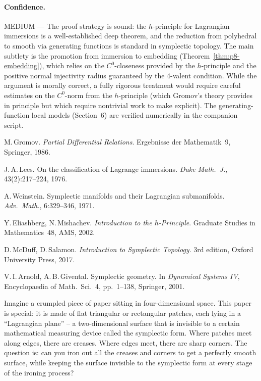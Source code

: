 \paragraph{Confidence.} MEDIUM --- The proof strategy is sound: the
$h$-principle for Lagrangian immersions is a well-established deep theorem,
and the reduction from polyhedral to smooth via generating functions is
standard in symplectic topology. The main subtlety is the promotion from
immersion to embedding (Theorem~\ref{thm:p8-embedding}), which relies on
the $C^0$-closeness provided by the $h$-principle and the positive normal
injectivity radius guaranteed by the 4-valent condition. While the argument
is morally correct, a fully rigorous treatment would require careful
estimates on the $C^0$-norm from the $h$-principle (which Gromov's theory
provides in principle but which require nontrivial work to make explicit).
The generating-function local models (Section~6) are verified numerically
in the companion script.


 M.\,Gromov.
\emph{Partial Differential Relations}.
Ergebnisse der Mathematik~9, Springer, 1986.

 J.\,A.\,Lees.
On the classification of Lagrange immersions.
\emph{Duke Math.\ J.}, 43(2):217--224, 1976.

 A.\,Weinstein.
Symplectic manifolds and their Lagrangian submanifolds.
\emph{Adv.\ Math.}, 6:329--346, 1971.

 Y.\,Eliashberg, N.\,Mishachev.
\emph{Introduction to the $h$-Principle}.
Graduate Studies in Mathematics~48, AMS, 2002.

 D.\,McDuff, D.\,Salamon.
\emph{Introduction to Symplectic Topology}.
3rd edition, Oxford University Press, 2017.

 V.\,I.\,Arnold, A.\,B.\,Givental.
Symplectic geometry.
In \emph{Dynamical Systems IV}, Encyclopaedia of Math.\ Sci.~4,
pp.~1--138, Springer, 2001.


Imagine a crumpled piece of paper sitting in four-dimensional space. This
paper is special: it is made of flat triangular or rectangular patches, each
lying in a ``Lagrangian plane'' -- a two-dimensional surface that is
invisible to a certain mathematical measuring device called the symplectic
form. Where patches meet along edges, there are creases. Where edges meet,
there are sharp corners. The question is: can you iron out all the creases
and corners to get a perfectly smooth surface, while keeping the surface
invisible to the symplectic form at every stage of the ironing process?

